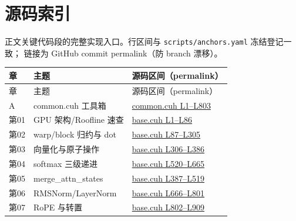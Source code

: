 \chapter{源码索引}\label{app:D}

正文关键代码段的完整实现入口。行区间与 \texttt{scripts/\allowbreak{}anchors.\allowbreak{}yaml} 冻结登记一致；
链接为 GitHub commit permalink（防 branch 漂移）。

\begin{longtable}{llp{7.2cm}}
\toprule
章 & 主题 & 源码区间（permalink） \\
\midrule
\endfirsthead
\toprule
章 & 主题 & 源码区间（permalink） \\
\midrule
\endhead
A & common.cuh 工具箱 & \href{https://github.com/xlite-dev/LeetCUDA/blob/6cd32deca683d6c4aae2011988c9f4a35bc5f528/kernels/interview/common.cuh#L1-L803}{common.cuh L1--L803} \\
第01 & GPU 架构/Roofline 速查 & \href{https://github.com/xlite-dev/LeetCUDA/blob/6cd32deca683d6c4aae2011988c9f4a35bc5f528/kernels/interview/base.cuh#L1-L86}{base.cuh L1--L86} \\
第02 & warp/block 归约与 dot & \href{https://github.com/xlite-dev/LeetCUDA/blob/6cd32deca683d6c4aae2011988c9f4a35bc5f528/kernels/interview/base.cuh#L87-L305}{base.cuh L87--L305} \\
第03 & 向量化与原子操作 & \href{https://github.com/xlite-dev/LeetCUDA/blob/6cd32deca683d6c4aae2011988c9f4a35bc5f528/kernels/interview/base.cuh#L306-L386}{base.cuh L306--L386} \\
第04 & softmax 三级递进 & \href{https://github.com/xlite-dev/LeetCUDA/blob/6cd32deca683d6c4aae2011988c9f4a35bc5f528/kernels/interview/base.cuh#L520-L665}{base.cuh L520--L665} \\
第05 & merge\_attn\_states & \href{https://github.com/xlite-dev/LeetCUDA/blob/6cd32deca683d6c4aae2011988c9f4a35bc5f528/kernels/interview/base.cuh#L387-L519}{base.cuh L387--L519} \\
第06 & RMSNorm/LayerNorm & \href{https://github.com/xlite-dev/LeetCUDA/blob/6cd32deca683d6c4aae2011988c9f4a35bc5f528/kernels/interview/base.cuh#L666-L801}{base.cuh L666--L801} \\
第07 & RoPE 与转置 & \href{https://github.com/xlite-dev/LeetCUDA/blob/6cd32deca683d6c4aae2011988c9f4a35bc5f528/kernels/interview/base.cuh#L802-L909}{base.cuh L802--L909} \\

\end{longtable}
